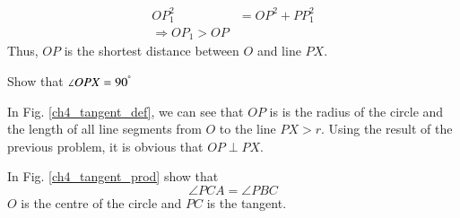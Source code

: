%
\begin{equation}
\begin{split}
OP_1^2 &= OP^2 + PP_1^2 \\
\Rightarrow OP_1 > OP
\end{split}
\end{equation}
%
Thus, $OP$ is the shortest distance between $O$ and line $PX$.
%
\begin{problem}
Show that $\angle OPX = 90 ^{\degree}$
\end{problem}
\proof In Fig. \ref{ch4_tangent_def}, we can see that $OP$ is is the radius of the circle and the length of all line segments from $O$ to the line $PX > r$.  Using the result of the previous 
problem, it is obvious that $OP \perp PX$. 
%
\begin{problem}
In Fig. \ref{ch4_tangent_prod} show that 
%
\begin{equation}
\angle PCA = \angle PBC
\end{equation}
%
$O$ is the centre of the circle and $PC$ is the tangent.
\end{problem}
